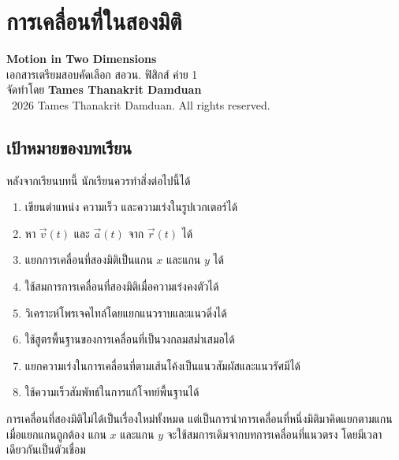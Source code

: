
\chapter{การเคลื่อนที่ในสองมิติ}

\begin{center}
    {\Large \textbf{Motion in Two Dimensions}}\\[4pt]
    {\normalsize เอกสารเตรียมสอบคัดเลือก สอวน. ฟิสิกส์ ค่าย 1}\\[6pt]
    {\normalsize จัดทำโดย \textbf{Tames Thanakrit Damduan}}\\[2pt]
    {\footnotesize \textcopyright\ 2026 Tames Thanakrit Damduan. All rights reserved.}\\[8pt]
\end{center}

\section*{เป้าหมายของบทเรียน}

หลังจากเรียนบทนี้ นักเรียนควรทำสิ่งต่อไปนี้ได้

\begin{enumerate}
    \item เขียนตำแหน่ง ความเร็ว และความเร่งในรูปเวกเตอร์ได้
    \item หา $\vec{v}(t)$ และ $\vec{a}(t)$ จาก $\vec{r}(t)$ ได้
    \item แยกการเคลื่อนที่สองมิติเป็นแกน $x$ และแกน $y$ ได้
    \item ใช้สมการการเคลื่อนที่สองมิติเมื่อความเร่งคงตัวได้
    \item วิเคราะห์โพรเจคไทล์โดยแยกแนวราบและแนวดิ่งได้
    \item ใช้สูตรพื้นฐานของการเคลื่อนที่เป็นวงกลมสม่ำเสมอได้
    \item แยกความเร่งในการเคลื่อนที่ตามเส้นโค้งเป็นแนวสัมผัสและแนวรัศมีได้
    \item ใช้ความเร็วสัมพัทธ์ในการแก้โจทย์พื้นฐานได้
\end{enumerate}

\begin{tcolorbox}[title=แนวคิดสำคัญของบทนี้]
การเคลื่อนที่สองมิติไม่ได้เป็นเรื่องใหม่ทั้งหมด แต่เป็นการนำการเคลื่อนที่หนึ่งมิติมาคิดแยกตามแกน เมื่อแยกแกนถูกต้อง แกน $x$ และแกน $y$ จะใช้สมการเดิมจากบทการเคลื่อนที่แนวตรง โดยมีเวลาเดียวกันเป็นตัวเชื่อม
\end{tcolorbox}

